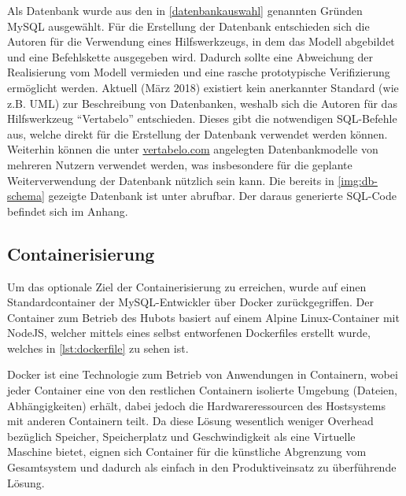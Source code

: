 

Als Datenbank wurde aus den in \autoref{datenbankauswahl} genannten Gründen MySQL ausgewählt.
Für die Erstellung der Datenbank entschieden sich die Autoren für die Verwendung eines Hilfswerkzeugs, in dem das Modell abgebildet und eine Befehlskette ausgegeben wird. Dadurch sollte eine Abweichung der Realisierung vom Modell vermieden und eine rasche prototypische Verifizierung ermöglicht werden. Aktuell (März 2018) existiert kein anerkannter Standard (wie z.B. UML) zur Beschreibung von Datenbanken, weshalb sich die Autoren für das Hilfswerkzeug \enquote{Vertabelo} entschieden. Dieses gibt die notwendigen SQL-Befehle aus, welche direkt für die Erstellung der Datenbank verwendet werden können. Weiterhin können die unter \url{vertabelo.com} angelegten Datenbankmodelle von mehreren Nutzern verwendet werden, was insbesondere für die geplante Weiterverwendung der Datenbank nützlich sein kann.
Die bereits in \autoref{img:db-schema} gezeigte Datenbank ist unter \cite{VertabeloDesignYourDatabase2018} abrufbar. Der daraus generierte SQL-Code befindet sich im Anhang.


\subsection{Containerisierung}

Um das optionale Ziel der Containerisierung zu erreichen, wurde auf einen Standardcontainer der MySQL-Entwickler über Docker zurückgegriffen. Der Container zum Betrieb des Hubots basiert auf einem Alpine Linux-Container mit NodeJS, welcher mittels eines selbst entworfenen Dockerfiles erstellt wurde, welches in \autoref{lst:dockerfile} zu sehen ist.


Docker ist eine Technologie zum Betrieb von Anwendungen in Containern, wobei jeder Container eine von den restlichen Containern isolierte Umgebung (Dateien, \linebreak Abhängigkeiten) erhält, dabei jedoch die Hardwareressourcen des Hostsystems mit anderen Containern teilt. Da diese Lösung wesentlich weniger Overhead bezüglich Speicher, Speicherplatz und Geschwindigkeit als eine Virtuelle Maschine bietet, eignen sich Container für die künstliche Abgrenzung vom Gesamtsystem und dadurch als einfach in den Produktiveinsatz zu überführende Lösung.

